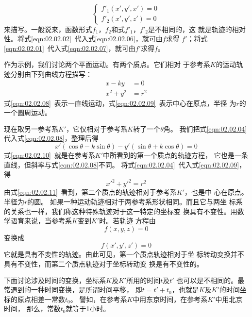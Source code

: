 ~\vspace{-1.56em}
\begin{equation}\label{eqn:02.02.07}
    \left\{\begin{array}{l}
        f'_1(x',y',x')=0 \\
        f'_2(x',y',z')=0
    \end{array}\right.
\end{equation}
来描写。一般说来，函数形式$f_1$，$f_2$和式$f'_1$，$f'_2$是不相同的，这
就是轨迹的相对性。将式\eqref{eqn:02.02.02}~代入式\eqref{eqn:02.02.06}，就可由$f$求得
$f'$；将式\eqref{eqn:02.02.01}~代入式\eqref{eqn:02.02.07}，就可由$f'$求得$f$。

作为示例，我们讨论两个平面运动。有两个质点。它们相对
于参考系$K$的运动轨迹分别由下列曲线方程描写：
\begin{align}
        x-ky&=0  \label{eqn:02.02.08}\\
    x^2+y^2&=r^2 \label{eqn:02.02.09}
\end{align}
式\eqref{eqn:02.02.08}~表示一直线运动，式\eqref{eqn:02.02.09}~表示中心在原点，半径
为$r$的一个圆周运动。

现在取另一参考系$K'$，它仅相对于参考系$K$转了一个$\theta$角。
我们把式\eqref{eqn:02.02.04}代入式\eqref{eqn:02.02.08}，整理后得
{\setlength{\mathindent}{4em}
\begin{equation}\label{eqn:02.02.10}
    x'(\cos\theta - k\sin\theta)-y'(\sin\theta + k\cos\theta)=0
\end{equation}}%
式\eqref{eqn:02.02.10}~就是在参考系$K'$中所看到的第一个质点的轨迹方程，
它也是一条直线，但斜率与式\eqref{eqn:02.02.08}不同。
将式\eqref{eqn:02.02.04}~代入式\eqref{eqn:02.02.09}，得
\begin{equation}\label{eqn:02.02.11}
    x'^2+y'^2=r^2
\end{equation}
由式\eqref{eqn:02.02.11}~看到，第二个质点的轨迹相对于参考系$K'$，也是中
心在原点。半径为$r$的圆。
如果一种运动轨迹相对于两参考系形状相同。而且它与两坐
标系的关系也一样，我们称这种特殊轨迹对于这一特定的坐标变
换具有不变性。用数学语育来说，当参考系$K$变到$K'$时。若轨迹
方程由
\begin{equation*}
    f(x,y,z)=0
\end{equation*}
变换成
\begin{equation*}
    f(x',y',z')=0
\end{equation*}
它就是具有不变性的轨迹。由此可见，第一个质点轨迹相对于坐
\clearpage
\noindent 标转动变换并不具有不变性，而第二个质点轨迹对于坐标转动变
换是有不变性的。

下面讨论涉及时间的变换，坐标系$K$及$K'$所用的时间$t$及$t'$
也可以是不相同的。最常遇到的一种时同变换，是所谓时间平移，
即$t=t'+t_0$，也就是$K$及$K'$的时间坐标的原点相差一常数$t_0$。
譬如，在参考系$K$中用东京时间，在参考系$K'$中用北京时间，
那么，常数$t_0$就等于1小时。


